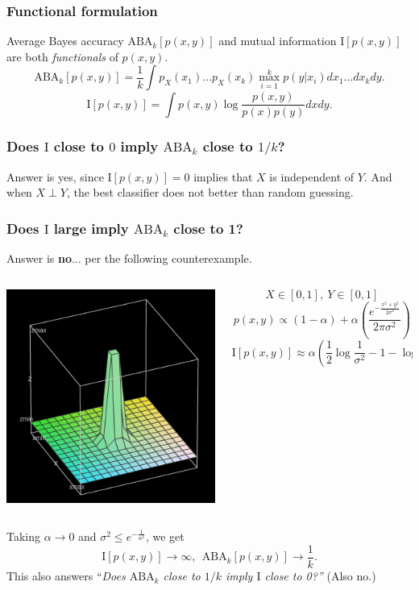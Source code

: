 \documentclass{beamer}
\begin{document}
\begin{frame}
\frametitle{Functional formulation}
Average Bayes accuracy $\text{ABA}_k[p(x, y)]$ and mutual information $\text{I}[p(x, y)]$ are both \emph{functionals} of $p(x, y)$.
\[
\text{ABA}_k[p(x, y)] = \frac{1}{k} \int p_X(x_1)\hdots p_X(x_k) \max_{i=1}^k p(y|x_i)  dx_1\hdots dx_k dy.
\]
\[
\text{I}[p(x, y)] = \int p(x, y) \log \frac{p(x, y)}{p(x)p(y)} dx dy.
\]
\end{frame}

\begin{frame}
\frametitle{Does $\text{I}$ close to $0$ imply $\text{ABA}_k$ close to $1/k$?}
Answer is yes, since $\text{I}[p(x, y)] = 0$ implies that $X$ is independent of $Y$.
And when $X \perp Y$, the best classifier does not better than random guessing.
\end{frame}

\begin{frame}
\frametitle{Does $\text{I}$ large imply $\text{ABA}_k$ close to 1?}
Answer is \textbf{no}... per the following counterexample.
\begin{columns}
\begin{column}{0.5\textwidth}
\begin{center}
\includegraphics[scale = 0.3]{witch_hat_func.png}
\end{center}
\end{column}
\begin{column}{0.5\textwidth}
\[
X \in [0,1],\ Y \in [0,1]
\]
\[
p(x, y) \propto (1- \alpha) + \alpha \left( \frac{e^{-\frac{x^2 + y^2}{2\sigma^2}}}{2\pi\sigma^2} \right)
\]
\[
\text{I}[p(x, y)] \approx \alpha(\frac{1}{2}\log \frac{1}{\sigma^2} - 1- \log (2\pi))
\]
\end{column}
\end{columns}
Taking $\alpha \to 0$ and $\sigma^2 \leq e^{-\frac{1}{\alpha^2}}$, we get 
\[\text{I}[p(x, y)] \to \infty,\ \ \text{ABA}_k[p(x, y)] \to \frac{1}{k}.\]
This also answers ``\emph{Does $\text{ABA}_k$ close to $1/k$ imply $\text{I}$ close to 0?''} (Also no.)
\end{frame}
\end{document}
